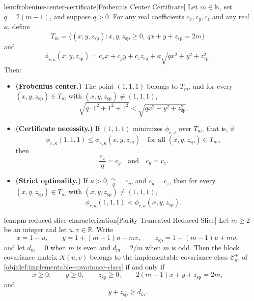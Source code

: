 \begin{lemmav}{lem:frobenius-center-certificate}[Frobenius Center Certificate]
Let \(m\in\mathbb N\), set \(q=2(m-1)\), and suppose \(q>0\).  For any real coefficients \(c_x,c_y,c_z\) and any real \(\kappa\), define
\[
T_m=\{(x,y,z_{\mathrm{sp}}): x,y,z_{\mathrm{sp}}\ge 0,\ qx+y+z_{\mathrm{sp}}=2m\}
\]
and
\[
\phi_{r,\kappa}(x,y,z_{\mathrm{sp}})
=
c_xx+c_yy+c_zz_{\mathrm{sp}}
+\kappa\sqrt{q x^2+y^2+z_{\mathrm{sp}}^2}.
\]
Then:
\begin{itemize}
\item \textbf{(Frobenius center.)} The point \((1,1,1)\) belongs to \(T_m\), and for every \((x,y,z_{\mathrm{sp}})\in T_m\) with \((x,y,z_{\mathrm{sp}})\ne(1,1,1)\),
\[
\sqrt{q\cdot 1^2+1^2+1^2}
<
\sqrt{q x^2+y^2+z_{\mathrm{sp}}^2}.
\]
\item \textbf{(Certificate necessity.)} If \((1,1,1)\) minimizes \(\phi_{r,\kappa}\) over \(T_m\), that is, if
\[
\phi_{r,\kappa}(1,1,1)\le
\phi_{r,\kappa}(x,y,z_{\mathrm{sp}})
\quad\text{for all }(x,y,z_{\mathrm{sp}})\in T_m,
\]
then
\[
\frac{c_x}{q}=c_y
\quad\text{and}\quad
c_y=c_z.
\]
\item \textbf{(Strict optimality.)} If \(\kappa>0\), \(\frac{c_x}{q}=c_y\), and \(c_y=c_z\), then for every \((x,y,z_{\mathrm{sp}})\in T_m\) with \((x,y,z_{\mathrm{sp}})\ne(1,1,1)\),
\[
\phi_{r,\kappa}(1,1,1)
<
\phi_{r,\kappa}(x,y,z_{\mathrm{sp}}).
\]
\end{itemize}
\end{lemmav}

\begin{lemmav}{lem:pm-reduced-slice-characterization}[Parity-Truncated Reduced Slice]
Let \(m\ge 2\) be an integer and let \(u,v\in\mathbb R\). Write
\[
x=1-u,\qquad
y=1+(m-1)u-mv,\qquad
z_{\mathrm{sp}}=1+(m-1)u+mv,
\]
and let \(d_m=0\) when \(m\) is even and \(d_m=2/m\) when \(m\) is odd. Then the block covariance matrix \(X(u,v)\) belongs to the implementable covariance class \(\mathcal C_m^{\pm}\) of \cref{obj:def:implementable-covariance-class} if and only if
\[
x\ge 0,\qquad y\ge 0,\qquad z_{\mathrm{sp}}\ge 0,\qquad
2(m-1)x+y+z_{\mathrm{sp}}=2m,
\]
and
\[
y+z_{\mathrm{sp}}\ge d_m .
\]
\end{lemmav}

